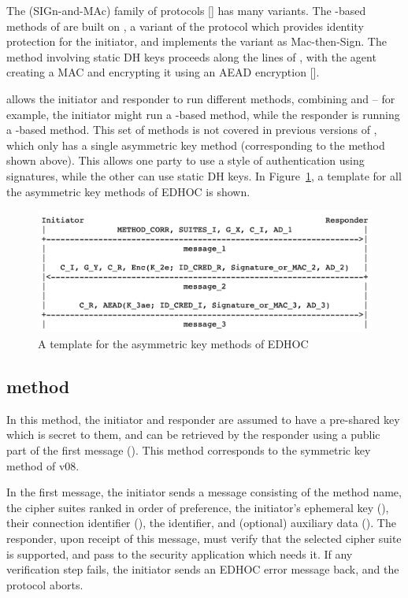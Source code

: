 The \mSigma (SIGn-and-MAc) family of protocols [\mcneed] has many variants. The \mSig-based methods of \mEdhoc are built on \mSigmaI, a variant of the \mSigma protocol which provides identity protection for the initiator, and  implements the \mSigmaI variant as Mac-then-Sign. The method involving static DH keys proceeds along the lines of \mOptls, with the agent creating a MAC and encrypting it using an AEAD encryption [\mcneed]. 


\mEdhoc allows the initiator and responder to run different methods, combining \mSig and \mStat -- for example, the initiator might run a \mSig-based method, while the responder is running a \mStat-based method. This set of methods is not covered in previous versions of \mEdhoc, which only has a single \mSigma asymmetric key method (corresponding to the \mSigSig method shown above). This allows one party to use a \mSigma style of authentication using signatures, while the other can use static DH keys. In Figure~\ref{fig:edhocasym}, a template for all the asymmetric key methods of EDHOC is shown. 

\begin{figure}[!h]\label{fig:edhocasym}
\centering
\includegraphics[scale=0.3]{Images/asym.png}
\caption{A template for the asymmetric key methods of EDHOC}
\end{figure}



\subsection{\mPskPsk method}
In this method, the initiator and responder are assumed to have a pre-shared key which is secret to them, and can be retrieved by the responder using a public part of the first message (\mIDPSK). This method corresponds to the symmetric key method of \mEdhoc v08. 

In the first message, the initiator sends a message consisting of the method name, the cipher suites ranked in order of preference, the initiator's ephemeral key (\mGx), their connection identifier (\mCi), the \mIDPSK identifier, and (optional) auxiliary data (\mADone). The responder, upon receipt of this message, must verify that the selected cipher suite is supported,  and pass \mADone to the security application which needs it. If any verification step fails, the initiator sends an EDHOC error message back, and the protocol aborts.

